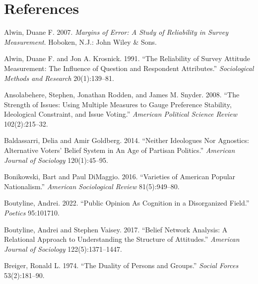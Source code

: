 \documentclass[
  11pt,
]{article}
\newlength{\cslhangindent}
\newlength{\cslentryspacingunit} %
\newenvironment{CSLReferences}[2] %
 {%
  \setlength{\parindent}{0pt}
  \ifodd #1
  \let\oldpar\par
  \def\par{\hangindent=\cslhangindent\oldpar}
  \fi
  \setlength{\parskip}{#2\cslentryspacingunit}
 }%
 {}
\begin{document}
\hypertarget{references}{%
\section*{References}\label{references}}

\hypertarget{refs}{}
\begin{CSLReferences}{1}{0}
\leavevmode{}%
Alwin, Duane F. 2007. \emph{Margins of {Error}: {A} {Study} of
{Reliability} in {Survey} {Measurement}}. Hoboken, N.J.: John Wiley \&
Sons.

\leavevmode{}%
Alwin, Duane F. and Jon A. Krosnick. 1991. {``The {Reliability} of
{Survey} {Attitude} {Measurement}: {The} {Influence} of {Question} and
{Respondent} {Attributes}.''} \emph{Sociological Methods and Research}
20(1):139--81.

\leavevmode{}%
Ansolabehere, Stephen, Jonathan Rodden, and James M. Snyder. 2008.
{``The {Strength} of {Issues}: {Using} {Multiple} {Measures} to {Gauge}
{Preference} {Stability}, {Ideological} {Constraint}, and {Issue}
{Voting}.''} \emph{American Political Science Review} 102(2):215--32.

\leavevmode{}%
Baldassarri, Delia and Amir Goldberg. 2014. {``Neither {Ideologues}
{Nor} {Agnostics}: {Alternative} {Voters}' {Belief} {System} in {An}
{Age} of {Partisan} {Politics}.''} \emph{American Journal of Sociology}
120(1):45--95.

\leavevmode{}%
Bonikowski, Bart and Paul DiMaggio. 2016. {``Varieties of {American}
{Popular} {Nationalism}.''} \emph{American Sociological Review}
81(5):949--80.

\leavevmode{}%
Boutyline, Andrei. 2022. {``Public {Opinion} {As} {Cognition} in a
{Disorganized} {Field}.''} \emph{Poetics} 95:101710.

\leavevmode{}%
Boutyline, Andrei and Stephen Vaisey. 2017. {``Belief {Network}
{Analysis}: {A} {Relational} {Approach} to {Understanding} the
{Structure} of {Attitudes}.''} \emph{American Journal of Sociology}
122(5):1371--1447.

\leavevmode{}%
Breiger, Ronald L. 1974. {``The {Duality} of {Persons} and {Groups}.''}
\emph{Social Forces} 53(2):181--90.


\end{CSLReferences}
\end{document}
